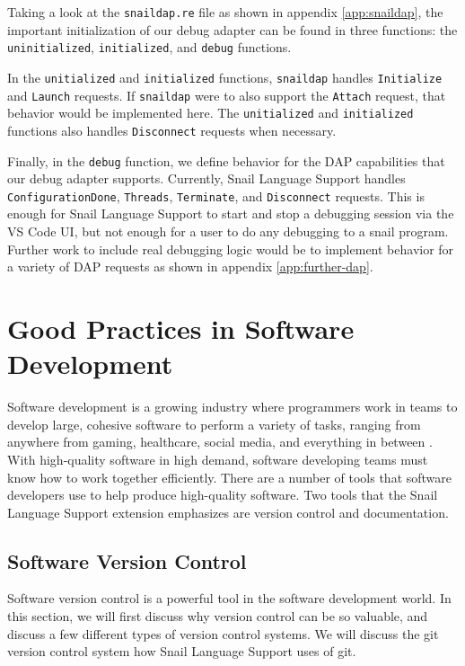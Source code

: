 \documentclass{article}
\begin{document}
Taking a look at the \lstinline{snaildap.re} file as shown in appendix \ref{app:snaildap}, the important initialization of our debug adapter can be found in three functions: the \lstinline{uninitialized}, \lstinline{initialized}, and \lstinline{debug} functions. 

In the \lstinline{unitialized} and \lstinline{initialized} functions, \lstinline{snaildap} handles \lstinline{Initialize} and \lstinline{Launch} requests. If \lstinline{snaildap} were to also support the \lstinline{Attach} request, that behavior would be implemented here. The \lstinline{unitialized} and \lstinline{initialized} functions also handles \lstinline{Disconnect} requests when necessary. 

Finally, in the \lstinline{debug} function, we define behavior for the DAP capabilities that our debug adapter supports. Currently, Snail Language Support handles \lstinline{ConfigurationDone}, \lstinline{Threads}, \lstinline{Terminate}, and \lstinline{Disconnect} requests. This is enough for Snail Language Support to start and stop a debugging session via the VS Code UI, but not enough for a user to do any debugging to a snail program. Further work to include real debugging logic would be to implement behavior for a variety of DAP requests as shown in appendix \ref{app:further-dap}. 

\section{Good Practices in Software Development}

Software development is a growing industry where programmers work in teams to develop large, cohesive software to perform a variety of tasks, ranging from anywhere from gaming, healthcare, social media, and everything in between \cite{BusinessResearchCompany_2023}. With high-quality software in high demand, software developing teams must know how to work together efficiently. There are a number of tools that software developers use to help produce high-quality software. Two tools that the Snail Language Support extension emphasizes are version control and documentation.

\subsection{Software Version Control}

Software version control is a powerful tool in the software development world. In this section, we will first discuss why version control can be so valuable, and discuss a few different types of version control systems. We will discuss the git version control system how Snail Language Support uses of git.
\end{document}

